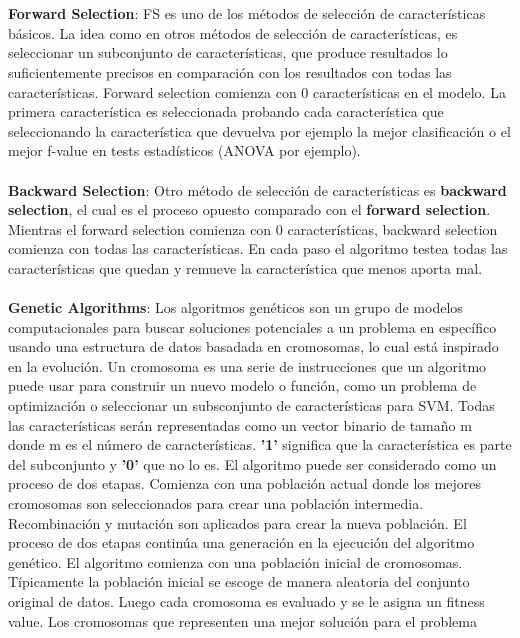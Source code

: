 \\\\
\textbf{Forward Selection}: FS es uno de los métodos de selección de características básicos. La idea como en otros métodos de selección de características, 
es seleccionar un subconjunto de características, que produce resultados lo suficientemente precisos en comparación con los resultados con todas las 
características. Forward selection comienza con 0 características en el modelo. La primera característica es seleccionada probando cada característica
que seleccionando la característica que devuelva por ejemplo la mejor clasificación o el mejor f-value  en tests estadísticos (ANOVA por ejemplo).   
\\\\
\textbf{Backward Selection}: Otro método de selección de características es \textbf{backward selection}, el cual es el proceso opuesto comparado con 
el \textbf{forward selection}. Mientras el forward selection comienza con 0 características, backward selection comienza con todas las características.
En cada paso el algoritmo testea todas las características que quedan y remueve la característica que menos aporta mal.
\\\\
\textbf{Genetic Algorithms}: Los algoritmos genéticos son un grupo de modelos computacionales para buscar soluciones potenciales a un problema en específico usando
una estructura de datos basadada en cromosomas, lo cual está inspirado en la evolución. Un cromosoma es una serie de instrucciones que un algoritmo puede usar para
construir un nuevo modelo o función, como un problema de optimización o seleccionar un subsconjunto de características para SVM. Todas las características serán 
representadas como un vector binario de tamaño m donde m es el número de características. \textbf{'1'} significa que la característica es parte del subconjunto y 
\textbf{'0'} que no lo es.  El algoritmo puede ser considerado como un proceso de dos etapas. Comienza con una población actual donde los mejores cromosomas son 
seleccionados para crear una población intermedia. Recombinación y mutación son aplicados para crear la nueva población. El proceso de dos etapas continúa una generación
en la ejecución del algoritmo genético.  El algoritmo comienza con una población inicial de cromosomas. Típicamente la población inicial se escoge de manera aleatoria 
del conjunto original de datos. Luego cada cromosoma es evaluado y se le asigna un fitness value. Los cromosomas que representen una mejor solución para el problema 
